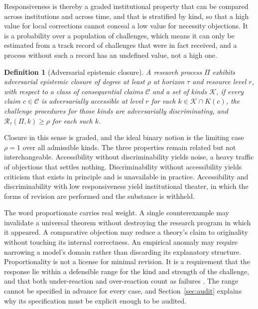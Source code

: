 \documentclass[11pt]{article}
\newtheorem{definition}{Definition}
\theoremstyle{remark}
\begin{document}
Responsiveness is thereby a graded institutional property that can be compared across institutions and across time, and that is stratified by kind, so that a high value for local corrections cannot conceal a low value for necessity objections. It is a probability over a population of challenges, which means it can only be estimated from a track record of challenges that were in fact received, and a process without such a record has an undefined value, not a high one.

\begin{definition}[Adversarial epistemic closure]
A research process $\Pi$ exhibits adversarial epistemic closure of degree at least $\rho$ at horizon $\tau$ and resource level $r$, with respect to a class of consequential claims $\mathcal{C}$ and a set of kinds $\mathcal K$, if every claim $c\in\mathcal{C}$ is adversarially accessible at level $r$ for each $k\in\mathcal K\cap K(c)$, the challenge procedures for those kinds are adversarially discriminating, and $\mathcal R_\tau(\Pi,k)\ge\rho$ for each such $k$.
\end{definition}

Closure in this sense is graded, and the ideal binary notion is the limiting case $\rho=1$ over all admissible kinds. The three properties remain related but not interchangeable. Accessibility without discriminability yields noise, a heavy traffic of objections that settles nothing. Discriminability without accessibility yields criticism that exists in principle and is unavailable in practice. Accessibility and discriminability with low responsiveness yield institutional theater, in which the forms of revision are performed and the substance is withheld.

The word proportionate carries real weight. A single counterexample may invalidate a universal theorem without destroying the research program in which it appeared. A comparative objection may reduce a theory's claim to originality without touching its internal correctness. An empirical anomaly may require narrowing a model's domain rather than discarding its explanatory structure. Proportionality is not a license for minimal revision. It is a requirement that the response lie within a defensible range for the kind and strength of the challenge, and that both under-reaction and over-reaction count as failures \cite{lakatos1970}. The range cannot be specified in advance for every case, and Section~\ref{sec:audit} explains why its specification must be explicit enough to be audited.
\end{document}
